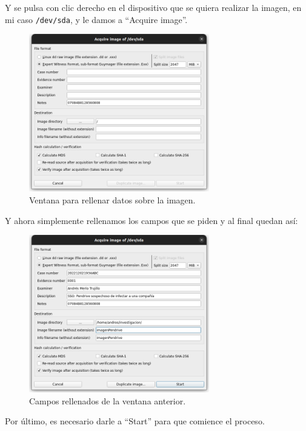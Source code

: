 \documentclass{article}
\begin{document}
Y se pulsa con clic derecho en el dispositivo que se quiera realizar la imagen, en mi caso \verb|/dev/sda|, y le damos a ``Acquire image''.

\begin{figure}[H]
    \centering
    \includegraphics[width=0.7\textwidth]{imagenes/Captura desde 2022-12-02 19-33-37.png}
    \caption{Ventana para rellenar datos sobre la imagen.}
\end{figure}

\newpage

Y ahora simplemente rellenamos los campos que se piden y al final quedan así:

\begin{figure}[H]
    \centering
    \includegraphics[width=0.7\textwidth]{imagenes/Captura desde 2022-12-02 19-36-04.png}
    \caption{Campos rellenados de la ventana anterior.}
\end{figure}

Por último, es necesario darle a ``Start'' para que comience el proceso.
\end{document}
